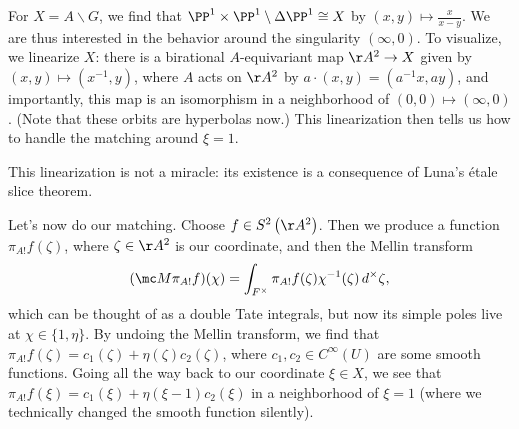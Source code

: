\documentclass[../notes.tex]{subfiles}
\begin{document}
For $X=A\backslash G$, we find that $\PP^1\times\PP^1\setminus\Delta\PP^1\cong X$ by $(x,y)\mapsto\frac x{x-y}$. We are thus interested in the behavior around the singularity $(\infty,0)$. To visualize, we linearize $X$: there is a birational $A$-equivariant map $\AA^2\to X$ given by $(x,y)\mapsto\left(x^{-1},y\right)$, where $A$ acts on $\AA^2$ by $a\cdot(x,y)=\left(a^{-1}x,ay\right)$, and importantly, this map is an isomorphism in a neighborhood of $(0,0)\mapsto(\infty,0)$. (Note that these orbits are hyperbolas now.) This linearization then tells us how to handle the matching around $\xi=1$.
\begin{remark}
	This linearization is not a miracle: its existence is a consequence of Luna's \'etale slice theorem.
\end{remark}
Let's now do our matching. Choose $f\in S^2\left(\AA^2\right)$. Then we produce a function $\pi_{A!}f(\zeta)$, where $\zeta\in\AA^2$ is our coordinate, and then the Mellin transform
\[(\mc M\pi_{A!}f)(\chi)=\int_{F^\times}\pi_{A!}f(\zeta)\chi^{-1}(\zeta)\,d^\times\zeta,\]
which can be thought of as a double Tate integrals, but now its simple poles live at $\chi\in\{1,\eta\}$. By undoing the Mellin transform, we find that $\pi_{A!}f(\zeta)=c_1(\zeta)+\eta(\zeta) c_2(\zeta)$, where $c_1,c_2\in C^\infty(U)$ are some smooth functions. Going all the way back to our coordinate $\xi\in X$, we see that $\pi_{A!}f(\xi)=c_1(\xi)+\eta(\xi-1)c_2(\xi)$ in a neighborhood of $\xi=1$ (where we technically changed the smooth function silently).
\end{document}
